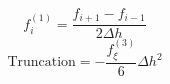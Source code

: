 \begin{equation} 
f^{{(1)}}_{i} = \frac{f_{{i+1}} - f_{{i-1}}}{2 {\Delta h}}
 \end{equation} 
\begin{equation} 
\text{Truncation} = - \frac{f^{{(3)}}_{{\xi}}}{6} {\Delta h}^{2}
 \end{equation}